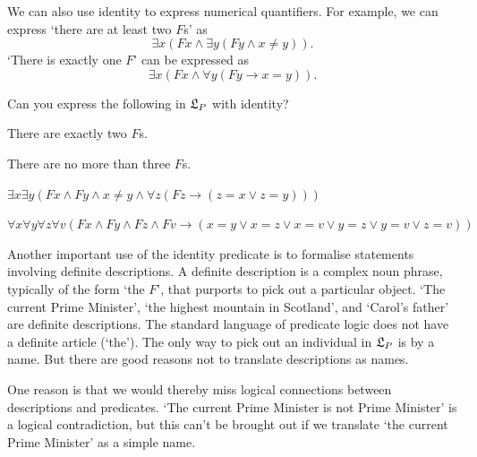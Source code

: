We can also use identity to express numerical quantifiers. For example, we can
express `there are at least two $F$s' as
\[
  \exists x(Fx \land \exists y(Fy \land x\not=y)).
\]
`There is exactly one $F$' can be expressed as
\[
  \exists x(Fx \land \forall y(Fy \to x\!=\!y)).
\]

\begin{exercise}
  Can you express the following in $\mathfrak{L}_P$ with identity?
  \begin{exlist}
  \item There are exactly two $F$s.
  \item There are no more than three $F$s.
  \end{exlist}
\end{exercise}
\begin{solution}
  \begin{sollist}
  \item $\exists x \exists y(Fx \land Fy \land x\not=y \land \forall z(Fz \to (z=x \lor z=y)))$
  \item $\forall x \forall y\forall z\forall v(Fx \land Fy \land Fz \land Fv \to (x=y \lor x=z \lor x=v \lor y=z \lor y=v \lor z=v))$
  \end{sollist}
\end{solution}

Another important use of the identity predicate is to formalise statements
involving definite descriptions. A definite description is a complex noun
phrase, typically of the form `the $F$', that purports to pick out a particular
object. `The current Prime Minister', `the highest mountain in Scotland', and
`Carol's father' are definite descriptions.
The standard language of predicate logic does not have a definite article
(`the'). The only way to pick out an individual in $\mathfrak{L}_P$ is by a name. But
there are good reasons not to translate descriptions as names.

One reason is that we would thereby miss logical connections between
descriptions and predicates. `The current Prime Minister is not Prime Minister'
is a logical contradiction, but this can't be brought out if we translate `the
current Prime Minister' as a simple name.


